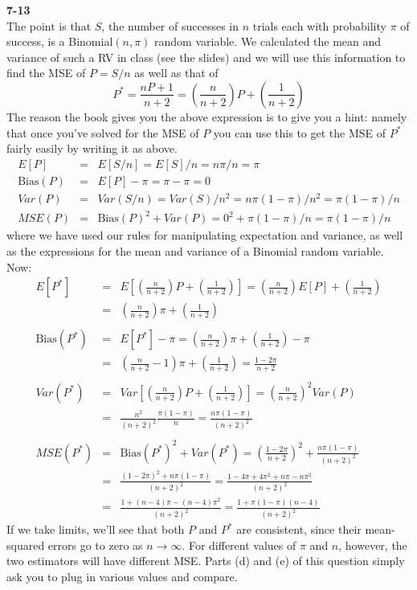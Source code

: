 \documentclass[addpoints,12pt]{exam}\usepackage[]{graphicx}\usepackage[]{color}
\begin{document}
\begin{questions}
  \item[]
    \begin{solution}
    \textbf{7-13}\\
The point is that $S$, the number of successes in $n$ trials each with probability $\pi$ of success, is a Binomial$(n,\pi)$ random variable. We calculated the mean and variance of such a RV in class (see the slides) and we will use this information to find the MSE of $P = S/n$ as well as that of
  $$P^* = \frac{nP + 1}{n+2} = \left(\frac{n}{n+2}\right)P + \left(\frac{1}{n+2}\right)$$
The reason the book gives you the above expression is to give you a hint: namely that once you've solved for the MSE of $P$ you can use this to get the MSE of $P^*$ fairly easily by writing it as above.
  \begin{eqnarray*}
		E[P] &=& E[S/n] = E[S]/n = n\pi/n = \pi\\
		\mbox{Bias}(P) &=& E[P] - \pi = \pi - \pi = 0\\
		Var(P) &=& Var(S/n) = Var(S)/n^2 = n\pi(1-\pi)/n^2 = \pi(1-\pi)/n \\
		MSE(P) &=& \mbox{Bias}(P)^2 + Var(P) = 0^2 + \pi(1-\pi)/n = \pi(1-\pi)/n
	\end{eqnarray*}
where we have used our rules for manipulating expectation and variance, as well as the expressions for the mean and variance of a Binomial random variable. Now:
	\begin{eqnarray*}
		E[P^*] &=& E\left[ \left(\frac{n}{n+2}\right)P + \left(\frac{1}{n+2}\right)\right]=  \left(\frac{n}{n+2}\right)E[P] + \left(\frac{1}{n+2}\right)\\
			&=&  \left(\frac{n}{n+2}\right)\pi + \left(\frac{1}{n+2}\right)\\\\
		\mbox{Bias}(P^*) &=& E[P^*] - \pi =  \left(\frac{n}{n+2}\right)\pi + \left(\frac{1}{n+2}\right) - \pi\\
			&=&\left(\frac{n}{n+2} -1\right)\pi + \left(\frac{1}{n+2}\right) = \frac{1-2\pi}{n+2}\\\\
		Var(P^*) &=& Var\left[  \left(\frac{n}{n+2}\right)P + \left(\frac{1}{n+2}\right)\right] = \left(\frac{n}{n+2}\right)^2 Var(P)\\
		&=& \frac{n^2}{(n+2)^2} \frac{\pi(1-\pi)}{n} = \frac{n\pi(1-\pi)}{(n+2)^2}\\ \\
		MSE(P^*) &=& \mbox{Bias}(P^*)^2 + Var(P^*) = \left(\frac{1-2\pi}{n+2}\right)^2 + \frac{n\pi(1-\pi)}{(n+2)^2}\\
			&=& \frac{(1-2\pi)^2 + n\pi(1-\pi)}{(n+2)^2} = \frac{1 - 4\pi + 4\pi^2 + n\pi - n\pi^2}{(n+2)^2}\\
			&=& \frac{1 + (n-4)\pi - (n-4)\pi^2 }{(n+2)^2} =\frac{1 + \pi(1-\pi)(n-4)}{(n+2)^2}
	\end{eqnarray*}
	If we take limits, we'll see that both $P$ and $P^*$ are consistent, since their mean-squared errors go to zero as $n\rightarrow  \infty$. For different values of $\pi$ and $n$, however, the two estimators will have different MSE. Parts (d) and (e) of this question simply ask you to plug in various values and compare.



\end{solution}
\end{questions}
\end{document}
